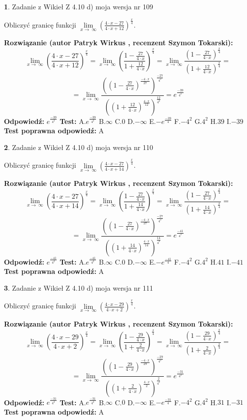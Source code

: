 \documentclass[12pt, a4paper]{article}
\theoremstyle{definition} %
\newtheorem{zad}{}
\newcommand{\zadStart}[1]{\begin{zad}#1\newline}
\newcommand{\zadStop}{\end{zad}}
\newcommand{\rozwStart}[2]{\noindent \textbf{Rozwiązanie (autor #1 , recenzent #2): }\newline}
\newcommand{\rozwStop}{\newline}
\newcommand{\odpStart}{\noindent \textbf{Odpowiedź:}\newline}
\newcommand{\odpStop}{\newline}
\newcommand{\testStart}{\noindent \textbf{Test:}\newline}
\newcommand{\testStop}{\newline}
\newcommand{\kluczStart}{\noindent \textbf{Test poprawna odpowiedź:}\newline}
\newcommand{\kluczStop}{\newline}
\begin{document}
\zadStart{Zadanie z Wikieł Z 4.10 d) moja wersja nr 109}


Obliczyć granicę funkcji  $\lim\limits_{x\to\ \infty}(\frac{4\cdot x-27}{4\cdot x+12})^{\frac{x}{4}}$.
\zadStop
\rozwStart{Patryk Wirkus}{Szymon Tokarski}
$$\lim\limits_{x\to\ \infty}(\frac{4\cdot x-27}{4\cdot x+12})^{\frac{x}{4}} = \lim\limits_{x\to\ \infty}(\frac{1-\frac{27}{4\cdot x}}{1+\frac{12}{4\cdot x}})^{\frac{x}{4}}=\lim\limits_{x\to\ \infty}\frac{(1-\frac{27}{4\cdot x})^{\frac{x}{4}}}{(1+\frac{12}{4\cdot x})^{\frac{x}{4}}}=$$
$$=\lim\limits_{x\to\ \infty}\frac{((1-\frac{27}{4\cdot x})^{\frac{-4\cdot x}{27}})^{\frac{-27}{4^{2}}}}{((1+\frac{12}{4\cdot x})^{\frac{4\cdot x}{12}})^{\frac{12}{4^{2}}}}=e^{\frac{-39}{4^{2}}}$$
\rozwStop
\odpStart
$e^{\frac{-39}{4^{2}}}$
\odpStop
\testStart
A.$e^{\frac{-39}{4^{2}}}$ B.$\infty$ C.$0$ D.$-\infty$ E.$-e^{\frac{-39}{4}}$
F.$-4^{2}$ G.$4^{2}$
H.$39$
I.$-39$
\testStop
\kluczStart
A
\kluczStop



\zadStart{Zadanie z Wikieł Z 4.10 d) moja wersja nr 110}


Obliczyć granicę funkcji  $\lim\limits_{x\to\ \infty}(\frac{4\cdot x-27}{4\cdot x+14})^{\frac{x}{4}}$.
\zadStop
\rozwStart{Patryk Wirkus}{Szymon Tokarski}
$$\lim\limits_{x\to\ \infty}(\frac{4\cdot x-27}{4\cdot x+14})^{\frac{x}{4}} = \lim\limits_{x\to\ \infty}(\frac{1-\frac{27}{4\cdot x}}{1+\frac{14}{4\cdot x}})^{\frac{x}{4}}=\lim\limits_{x\to\ \infty}\frac{(1-\frac{27}{4\cdot x})^{\frac{x}{4}}}{(1+\frac{14}{4\cdot x})^{\frac{x}{4}}}=$$
$$=\lim\limits_{x\to\ \infty}\frac{((1-\frac{27}{4\cdot x})^{\frac{-4\cdot x}{27}})^{\frac{-27}{4^{2}}}}{((1+\frac{14}{4\cdot x})^{\frac{4\cdot x}{14}})^{\frac{14}{4^{2}}}}=e^{\frac{-41}{4^{2}}}$$
\rozwStop
\odpStart
$e^{\frac{-41}{4^{2}}}$
\odpStop
\testStart
A.$e^{\frac{-41}{4^{2}}}$ B.$\infty$ C.$0$ D.$-\infty$ E.$-e^{\frac{-41}{4}}$
F.$-4^{2}$ G.$4^{2}$
H.$41$
I.$-41$
\testStop
\kluczStart
A
\kluczStop



\zadStart{Zadanie z Wikieł Z 4.10 d) moja wersja nr 111}


Obliczyć granicę funkcji  $\lim\limits_{x\to\ \infty}(\frac{4\cdot x-29}{4\cdot x+2})^{\frac{x}{4}}$.
\zadStop
\rozwStart{Patryk Wirkus}{Szymon Tokarski}
$$\lim\limits_{x\to\ \infty}(\frac{4\cdot x-29}{4\cdot x+2})^{\frac{x}{4}} = \lim\limits_{x\to\ \infty}(\frac{1-\frac{29}{4\cdot x}}{1+\frac{2}{4\cdot x}})^{\frac{x}{4}}=\lim\limits_{x\to\ \infty}\frac{(1-\frac{29}{4\cdot x})^{\frac{x}{4}}}{(1+\frac{2}{4\cdot x})^{\frac{x}{4}}}=$$
$$=\lim\limits_{x\to\ \infty}\frac{((1-\frac{29}{4\cdot x})^{\frac{-4\cdot x}{29}})^{\frac{-29}{4^{2}}}}{((1+\frac{2}{4\cdot x})^{\frac{4\cdot x}{2}})^{\frac{2}{4^{2}}}}=e^{\frac{-31}{4^{2}}}$$
\rozwStop
\odpStart
$e^{\frac{-31}{4^{2}}}$
\odpStop
\testStart
A.$e^{\frac{-31}{4^{2}}}$ B.$\infty$ C.$0$ D.$-\infty$ E.$-e^{\frac{-31}{4}}$
F.$-4^{2}$ G.$4^{2}$
H.$31$
I.$-31$
\testStop
\kluczStart
A
\kluczStop
\end{document}
